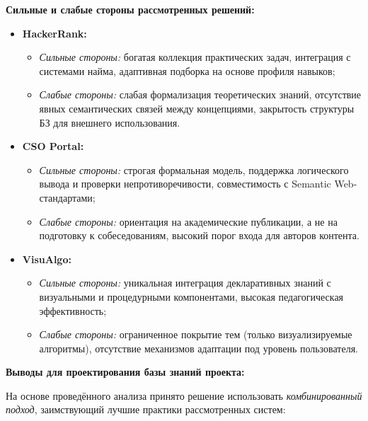\newpage

\textbf{Сильные и слабые стороны рассмотренных решений:}

\begin{itemize}
    \item \textbf{HackerRank:}
    \begin{itemize}
        \item \textit{Сильные стороны:} богатая коллекция практических задач, интеграция с системами найма, адаптивная подборка на основе профиля навыков;
        \item \textit{Слабые стороны:} слабая формализация теоретических знаний, отсутствие явных семантических связей между концепциями, закрытость структуры БЗ для внешнего использования.
    \end{itemize}
    
    \item \textbf{CSO Portal:}
    \begin{itemize}
        \item \textit{Сильные стороны:} строгая формальная модель, поддержка логического вывода и проверки непротиворечивости, совместимость с Semantic Web-стандартами;
        \item \textit{Слабые стороны:} ориентация на академические публикации, а не на подготовку к собеседованиям, высокий порог входа для авторов контента.
    \end{itemize}
    
    \item \textbf{VisuAlgo:}
    \begin{itemize}
        \item \textit{Сильные стороны:} уникальная интеграция декларативных знаний с визуальными и процедурными компонентами, высокая педагогическая эффективность;
        \item \textit{Слабые стороны:} ограниченное покрытие тем (только визуализируемые алгоритмы), отсутствие механизмов адаптации под уровень пользователя.
    \end{itemize}
\end{itemize}

\textbf{Выводы для проектирования базы знаний проекта:}

На основе проведённого анализа принято решение использовать \textit{комбинированный подход}, заимствующий лучшие практики рассмотренных систем:

